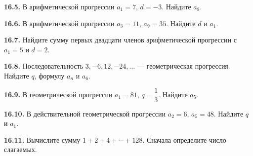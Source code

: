 \noindent\begin{minipage}[t]{\linewidth}\textbf{16.5.} В арифметической прогрессии \(a_1=7\), \(d=-3\). Найдите \(a_8\).\par\end{minipage}\par
\noindent\begin{minipage}[t]{\linewidth}\textbf{16.6.} В арифметической прогрессии \(a_3=11\), \(a_9=35\). Найдите \(d\) и \(a_1\).\par\end{minipage}\par
\noindent\begin{minipage}[t]{\linewidth}\textbf{16.7.} Найдите сумму первых двадцати членов арифметической прогрессии с \(a_1=5\) и \(d=2\).\par\end{minipage}\par
\noindent\begin{minipage}[t]{\linewidth}\textbf{16.8.} Последовательность \(3,-6,12,-24,\ldots\) — геометрическая прогрессия. Найдите \(q\), формулу \(a_n\) и \(a_6\).\par\end{minipage}\par
\noindent\begin{minipage}[t]{\linewidth}\textbf{16.9.} В геометрической прогрессии \(a_1=81\), \(q=\dfrac13\). Найдите \(a_5\).\par\end{minipage}\par
\noindent\begin{minipage}[t]{\linewidth}\textbf{16.10.} В действительной геометрической прогрессии \(a_2=6\), \(a_5=48\). Найдите \(q\) и \(a_1\).\par\end{minipage}\par
\noindent\begin{minipage}[t]{\linewidth}\textbf{16.11.} Вычислите сумму \(1+2+4+\cdots+128\). Сначала определите число слагаемых.\par\end{minipage}\par
